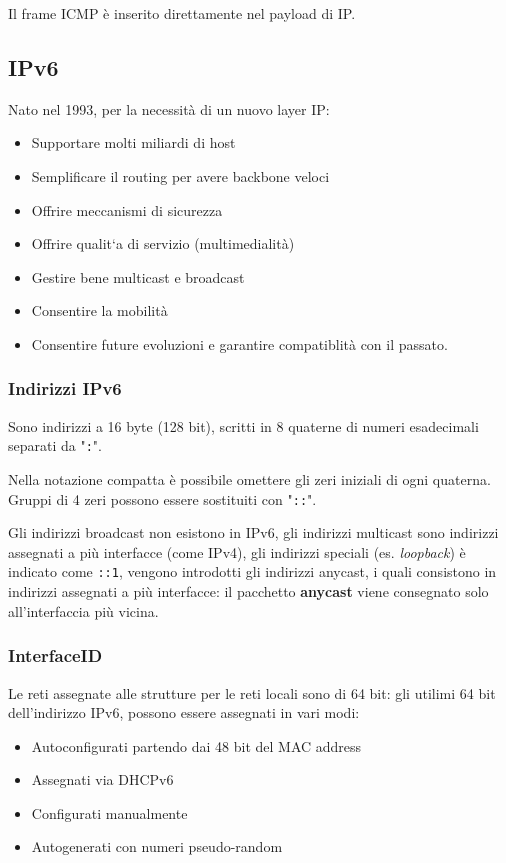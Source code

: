             Il frame ICMP è inserito direttamente nel payload di IP.

    \subsection{IPv6}
        Nato nel 1993, per la necessità di un nuovo layer IP:
        \begin{itemize}
            \item Supportare molti miliardi di host
            \item Semplificare il routing per avere backbone veloci
            \item Offrire meccanismi di sicurezza
            \item Offrire qualit`a di servizio (multimedialità)
            \item Gestire bene multicast e broadcast
            \item Consentire la mobilità
            \item Consentire future evoluzioni e garantire compatiblità con il passato.
        \end{itemize}

        \subsubsection{Indirizzi IPv6}
            Sono indirizzi a 16 byte (128 bit), scritti in 8 quaterne di numeri esadecimali separati da "\verb-:-".
    
            Nella notazione compatta è possibile omettere gli zeri iniziali di ogni quaterna. Gruppi di 4 zeri possono essere sostituiti con "\verb-::-".

            Gli indirizzi broadcast non esistono in IPv6, gli indirizzi multicast sono indirizzi assegnati a più interfacce (come IPv4), gli indirizzi speciali (es. \textit{loopback}) è indicato come \verb-::1-, vengono introdotti gli indirizzi anycast, i quali consistono in indirizzi assegnati a più interfacce: il pacchetto \textbf{anycast} viene consegnato solo all'interfaccia più vicina.

        \subsubsection{InterfaceID}
            Le reti assegnate alle strutture per le reti locali sono di 64 bit: gli utilimi 64 bit dell'indirizzo IPv6, possono essere assegnati in vari modi:
            \begin{itemize}
                \item Autoconfigurati partendo dai 48 bit del MAC address
                \item Assegnati via DHCPv6
                \item Configurati manualmente
                \item Autogenerati con numeri pseudo-random
            \end{itemize}

